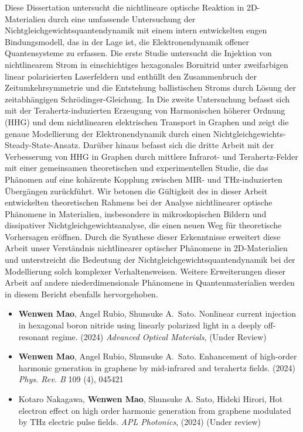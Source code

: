 \documentclass[a4paper, twoside]{NUSThesis}
\begin{document}
{\begin{abstraktum}
	Diese Dissertation untersucht die nichtlineare optische Reaktion in 2D-Materialien durch eine umfassende Untersuchung der Nichtgleichgewichtsquantendynamik mit einem intern entwickelten engen Bindungsmodell, das in der Lage ist, die Elektronendynamik offener Quantensysteme zu erfassen. Die erste Studie untersucht die Injektion von nichtlinearem Strom in einschichtiges hexagonales Bornitrid unter zweifarbigen linear polarisierten Laserfeldern und enthüllt den Zusammenbruch der Zeitumkehrsymmetrie und die Entstehung ballistischen Stroms durch Lösung der zeitabhängigen Schrödinger-Gleichung. In Die zweite Untersuchung befasst sich mit der Terahertz-induzierten Erzeugung von Harmonischen höherer Ordnung (HHG) und dem nichtlinearen elektrischen Transport in Graphen und zeigt die genaue Modellierung der Elektronendynamik durch einen Nichtgleichgewichts-Steady-State-Ansatz. Darüber hinaus befasst sich die dritte Arbeit mit der Verbesserung von HHG in Graphen durch mittlere Infrarot- und Terahertz-Felder mit einer gemeinsamen theoretischen und experimentellen Studie, die das Phänomen auf eine kohärente Kopplung zwischen MIR- und THz-induzierten Übergängen zurückführt. Wir betonen die Gültigkeit des in dieser Arbeit entwickelten theoretischen Rahmens bei der Analyse nichtlinearer optische Phänomene in Materialien, insbesondere in mikroskopischen Bildern und dissipativer Nichtgleichgewichtsanalyse, die einen neuen Weg für theoretische Vorhersagen eröffnen. Durch die Synthese dieser Erkenntnisse erweitert diese Arbeit unser Verständnis nichtlinearer optischer Phänomene in 2D-Materialien und unterstreicht die Bedeutung der Nichtgleichgewichtsquantendynamik bei der Modellierung solch komplexer Verhaltensweisen. Weitere Erweiterungen dieser Arbeit auf andere niederdimensionale Phänomene in Quantenmaterialien werden in diesem Bericht ebenfalls hervorgehoben.
\end{abstraktum}
\listoffigures
\listofpublications
\begin{itemize}
	\item \textbf{Wenwen Mao}, Angel Rubio, Shunsuke A.~Sato. Nonlinear current injection in hexagonal boron nitride using linearly polarized light in a deeply off-resonant regime. (2024) {\it Advanced Optical Materials}, (Under Review)
	\item \textbf{Wenwen Mao}, Angel Rubio, Shunsuke A.~Sato. Enhancement of high-order harmonic generation in graphene by mid-infrared and terahertz fields. (2024) {\it Phys. Rev. B} 109 (4), 045421
	\item Kotaro Nakagawa, \textbf{Wenwen Mao}, Shunsuke A. Sato, Hideki Hirori, Hot electron effect on high order harmonic generation from graphene modulated by THz electric pulse fields. {\it APL Photonics}, (2024) (Under review)

\end{itemize}}
\end{document}
